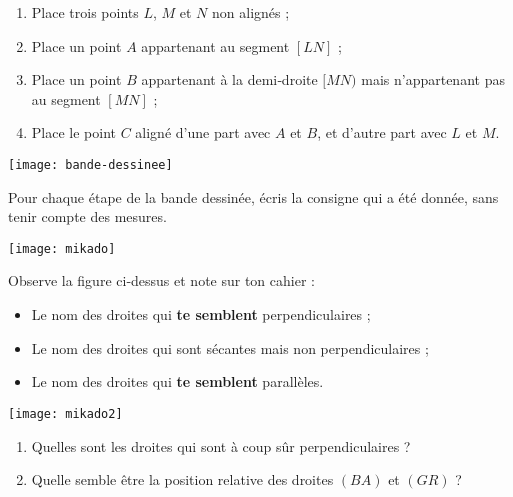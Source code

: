\begin{exercice}
\begin{enumerate} 
 \item Place trois points $L$, $M$ et $N$ non alignés ;
 \item Place un point $A$ appartenant au segment $[LN]$ ;
 \item Place un point $B$ appartenant à la demi‑droite $[MN)$ mais n'appartenant pas au segment $[MN]$ ;
 \item Place le point $C$ aligné d'une part avec $A$ et $B$, et d'autre part avec $L$ et $M$.
 \end{enumerate}
\end{exercice}



\vspace{1em}



\begin{exercice}
 \begin{center} \texttt{[image: bande-dessinee]}  \end{center}
Pour chaque étape de la bande dessinée, écris la consigne qui a été donnée, sans tenir compte des mesures.
\end{exercice}



\begin{exercice}
 \begin{center} \texttt{[image: mikado]}  \end{center}
Observe la figure ci‑dessus et note sur ton cahier :
\begin{itemize}
 \item Le nom des droites qui \textbf{te semblent} perpendiculaires ;
 \item Le nom des droites qui sont sécantes mais non perpendiculaires ;
 \item Le nom des droites qui \textbf{te semblent} parallèles.
 \end{itemize}
\end{exercice}


\begin{exercice}
 \begin{center} \texttt{[image: mikado2]}  \end{center}
\begin{enumerate}
 \item Quelles sont les droites qui sont à coup sûr perpendiculaires ?
 \item Quelle semble être la position relative des droites $(BA)$ et $(GR)$ ?
 \end{enumerate}
\end{exercice}


